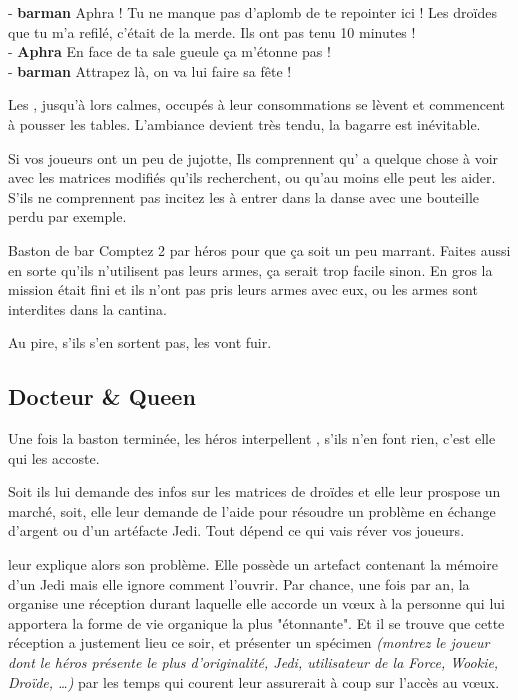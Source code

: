\begin{quotebox}
- \textbf{barman} Aphra ! Tu ne manque pas d’aplomb de te repointer ici ! Les droïdes que tu m’a refilé, c’était de la merde. Ils ont pas tenu 10 minutes !\\
- \textbf{Aphra} En face de ta sale gueule ça m’étonne pas !\\
- \textbf{barman} Attrapez là, on va lui faire sa fête !
\end{quotebox}

Les , jusqu’à lors calmes, occupés à leur consommations se lèvent et commencent à pousser les tables. L’ambiance devient très tendu, la bagarre est inévitable. 

Si vos joueurs ont un peu de jujotte, Ils comprennent qu’ a quelque chose à voir avec les matrices modifiés qu’ils recherchent, ou qu’au moins elle peut les aider. S’ils ne comprennent pas incitez les à entrer dans la danse avec une bouteille perdu par exemple.

\begin{paperbox}{Baston de bar}
Comptez 2  par héros pour que ça soit un peu marrant. Faites aussi en sorte qu’ils n’utilisent pas leurs armes, ça serait trop facile sinon. En gros la mission était fini et ils n’ont pas pris leurs armes avec eux, ou les armes sont interdites dans la cantina.

Au pire, s’ils s’en sortent pas, les  vont fuir.
\end{paperbox}

\subsection{Docteur \& Queen}

Une fois la baston terminée, les héros interpellent , s’ils n’en font rien, c’est elle qui les accoste.

Soit ils lui demande des infos sur les matrices de droïdes et elle leur prospose un marché, soit, elle leur demande de l’aide pour résoudre un problème en échange d’argent ou d’un artéfacte Jedi. Tout dépend ce qui vais réver vos joueurs.

 leur explique alors son problème. Elle possède un artefact contenant la mémoire d’un Jedi mais elle ignore comment l’ouvrir. Par chance, une fois par an, la  organise une réception durant laquelle elle accorde un vœux à la personne qui lui apportera la forme de vie organique la plus "étonnante". Et il se trouve que cette réception a justement lieu ce soir, et présenter un spécimen \textit{(montrez le joueur dont le héros présente le plus d’originalité, Jedi, utilisateur de la Force, Wookie, Droïde, \dots)} par les temps qui courent leur assurerait à coup sur l’accès au vœux.

